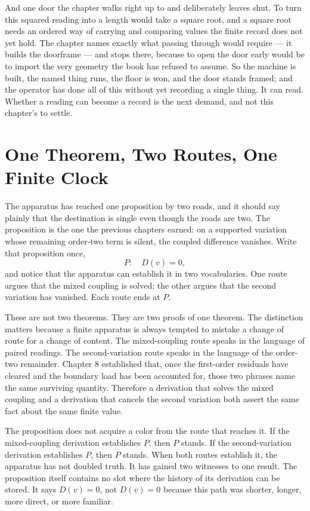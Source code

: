 And one door the chapter walks right up to and deliberately leaves shut. To turn this squared reading into a length would take a square root, and a square root needs an ordered way of carrying and comparing values the finite record does not yet hold. The chapter names exactly what passing through would require --- it builds the doorframe --- and stops there, because to open the door early would be to import the very geometry the book has refused to assume. So the machine is built, the named thing runs, the floor is won, and the door stands framed; and the operator has done all of this without yet recording a single thing. It can read. Whether a reading can become a record is the next demand, and not this chapter's to settle.

\section{One Theorem, Two Routes, One Finite Clock}

The apparatus has reached one proposition by two roads, and it should say plainly
that the destination is single even though the roads are two. The proposition is
the one the previous chapters earned: on a supported variation whose remaining
order-two term is silent, the coupled difference vanishes. Write that proposition
once,
\[
  P : \quad D(v) = 0,
\]
and notice that the apparatus can establish it in two vocabularies. One route
argues that the mixed coupling is solved; the other argues that the second
variation has vanished. Each route ends at \(P\).

These are not two theorems. They are two proofs of one theorem. The distinction
matters because a finite apparatus is always tempted to mistake a change of
route for a change of content. The mixed-coupling route speaks in the language
of paired readings. The second-variation route speaks in the language of the
order-two remainder. Chapter 8 established that, once the first-order residuals
have cleared and the boundary load has been accounted for, those two phrases
name the same surviving quantity. Therefore a derivation that solves the mixed
coupling and a derivation that cancels the second variation both assert the same
fact about the same finite value.

The proposition does not acquire a color from the route that reaches it. If the
mixed-coupling derivation establishes \(P\), then \(P\) stands. If the
second-variation derivation establishes \(P\), then \(P\) stands. When both
routes establish it, the apparatus has not doubled truth. It has gained two
witnesses to one result. The proposition itself contains no slot where the
history of its derivation can be stored. It says \(D(v)=0\), not \(D(v)=0\)
because this path was shorter, longer, more direct, or more familiar.

